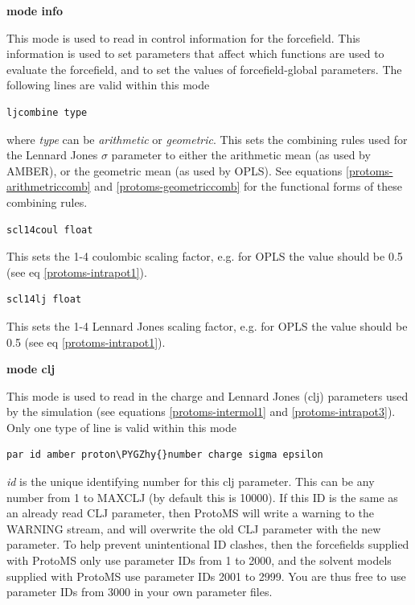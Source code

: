 \documentclass[letterpaper,10pt,english]{sphinxmanual}
\def\PYGZhy{\char`\-}
\begin{document}
\textbf{mode info}

This mode is used to read in control information for the forcefield. This information is used to set parameters that affect which functions are used to evaluate the forcefield, and to set the values of forcefield-global parameters. The following lines are valid within this mode

\begin{Verbatim}[commandchars=\\\{\}]
ljcombine type
\end{Verbatim}

where \emph{type} can be \emph{arithmetic} or \emph{geometric}. This sets the combining rules used for the Lennard Jones \(\sigma\) parameter to either the arithmetic mean (as used by AMBER), or the geometric mean (as used by OPLS). See equations \eqref{protoms-arithmetriccomb} and \eqref{protoms-geometriccomb} for the functional forms of these combining rules.

\begin{Verbatim}[commandchars=\\\{\}]
scl14coul float
\end{Verbatim}

This sets the 1-4 coulombic scaling factor, e.g. for OPLS the value should be 0.5 (see eq \eqref{protoms-intrapot1}).

\begin{Verbatim}[commandchars=\\\{\}]
scl14lj float
\end{Verbatim}

This sets the 1-4 Lennard Jones scaling factor, e.g. for OPLS the value should be 0.5 (see eq \eqref{protoms-intrapot1}).

\textbf{mode clj}

This mode is used to read in the charge and Lennard Jones (clj) parameters used by the simulation (see equations \eqref{protoms-intermol1} and \eqref{protoms-intrapot3}). Only one type of line is valid within this mode

\begin{Verbatim}[commandchars=\\\{\}]
par id amber proton\PYGZhy{}number charge sigma epsilon
\end{Verbatim}

\emph{id} is the unique identifying number for this clj parameter. This can be any number from 1 to MAXCLJ (by default this is 10000). If this ID is the same as an already read CLJ parameter, then ProtoMS will write a warning to the WARNING stream, and will overwrite the old CLJ parameter with the new parameter. To help prevent unintentional ID clashes, then the forcefields supplied with ProtoMS only use parameter IDs from 1 to 2000, and the solvent models supplied with ProtoMS use parameter IDs 2001 to 2999. You are thus free to use parameter IDs from 3000 in your own parameter files.
\end{document}
